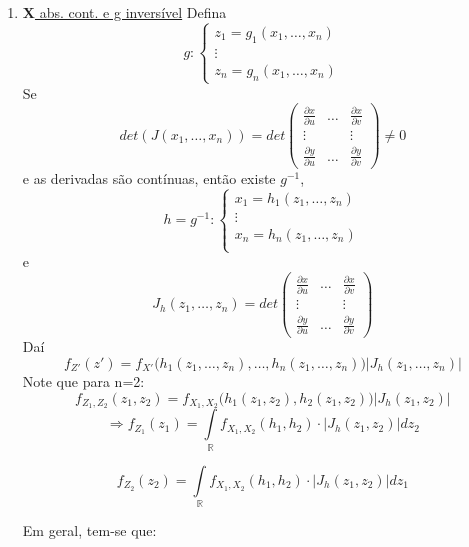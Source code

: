 \documentclass[a4paper,12pt]{article}
\begin{document}
	\begin{enumerate}
		\item \underline{$\bm X$ abs. cont. e g inversível}
		Defina
		$$ g:
		\begin{cases}
		z_1=g_1(x_1,\ldots,x_n)\\
		\vdots\\
		z_n = g_n(x_1,\ldots,x_n)
		\end{cases}
		$$
		Se $$
		det(J(x_1,\ldots,x_n))=det\begin{pmatrix}
			\frac{\partial x}{\partial u}&\ldots &\frac{\partial x}{\partial v}  \\
			\vdots & &\vdots\\
			\frac{\partial y}{\partial u}&\ldots & \frac{\partial y}{\partial v}  
			\end{pmatrix}\ne 0$$
			e as derivadas são contínuas, então existe $g^{-1}$,
			$$h=g^{-1}:\begin{cases}
			x_1=h_1(z_1,\ldots,z_n)\\
			\vdots\\
						x_n=h_n(z_1,\ldots,z_n)\\
			
			\end{cases} $$
			e
$$J_h(z_1,\ldots,z_n)=
det\begin{pmatrix}
\frac{\partial x}{\partial u}&\ldots &\frac{\partial x}{\partial v}  \\
\vdots & &\vdots\\
\frac{\partial y}{\partial u}&\ldots & \frac{\partial y}{\partial v}  
\end{pmatrix}
 $$
 Daí
 $$f_{Z'}(z')=f_{X'}\bigg(h_1(z_1,\ldots,z_n),\ldots,h_n(z_1,\ldots,z_n)\bigg)\bigg|
 J_h(z_1,\ldots,z_n)
 \bigg| $$
			Note que para n=2:
			$$f_{Z_1,Z_2}(z_1,z_2)=
			f_{X_1,X_2}\bigg(
			h_1(z_1,z_2),h_2(z_1,z_2)
			\bigg)\bigg|
			J_h(z_1,z_2)
			\bigg|
			 $$
			$$\Rightarrow
			f_{Z_1}(z_1)= \int\limits_{\mathbb R} f_{X_1,X_2}(h_1,h_2)\cdot \bigg|
			J_h(z_1,z_2)
			\bigg|dz_2
			 $$
			 
			 $$
			 			f_{Z_2}(z_2)= \int\limits_{\mathbb R} f_{X_1,X_2}(h_1,h_2)\cdot \bigg|
			 J_h(z_1,z_2)
			 \bigg|dz_1
			 $$
			 
			 Em geral, tem-se que:
			 

\end{enumerate}
\end{document}
